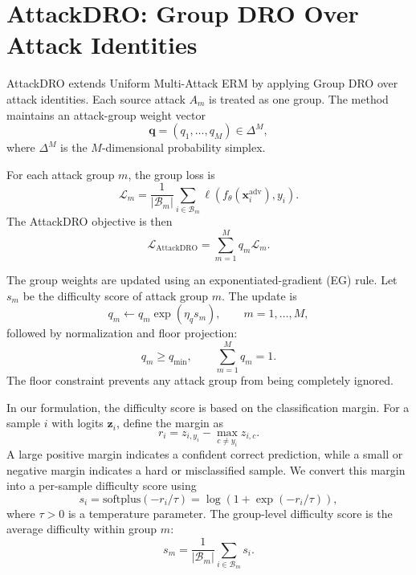 \section{AttackDRO: Group DRO Over Attack Identities}
\label{sec:ch4_attackdro}

AttackDRO extends Uniform Multi-Attack ERM by applying Group DRO over attack
identities. Each source attack \(A_m\) is treated as one group. The method
maintains an attack-group weight vector
\begin{equation}
    \mathbf{q} = (q_1,\ldots,q_M) \in \Delta^M,
\end{equation}
where \(\Delta^M\) is the \(M\)-dimensional probability simplex.

For each attack group \(m\), the group loss is
\begin{equation}
    \mathcal{L}_m
    =
    \frac{1}{|\mathcal{B}_m|}
    \sum_{i \in \mathcal{B}_m}
    \ell\!\left(
        f_\theta(\mathbf{x}_i^{\mathrm{adv}}),
        y_i
    \right).
\end{equation}
The AttackDRO objective is then
\begin{equation}
    \mathcal{L}_{\mathrm{AttackDRO}}
    =
    \sum_{m=1}^{M} q_m \mathcal{L}_m.
\end{equation}

The group weights are updated using an exponentiated-gradient (EG) rule. Let \(s_m\)
be the difficulty score of attack group \(m\). The update is
\begin{equation}
    q_m \leftarrow q_m \exp(\eta_q s_m),
    \qquad m=1,\ldots,M,
    \label{eq:eg}
\end{equation}
followed by normalization and floor projection:
\begin{equation}
    q_m \ge q_{\min},
    \qquad
    \sum_{m=1}^{M} q_m = 1.
    \label{eq:attackdro_floor}
\end{equation}
The floor constraint prevents any attack group from being completely ignored.

In our formulation, the difficulty score is based on the classification margin. For a
sample \(i\) with logits \(\mathbf{z}_i\), define the margin as
\begin{equation}
    r_i
    =
    z_{i,y_i}
    -
    \max_{c \ne y_i} z_{i,c}.
\end{equation}
A large positive margin indicates a confident correct prediction, while a small or
negative margin indicates a hard or misclassified sample. We convert this margin into
a per-sample difficulty score using
\begin{equation}
    s_i
    =
    \mathrm{softplus}(-r_i/\tau)
    =
    \log(1+\exp(-r_i/\tau)),
\end{equation}
where \(\tau>0\) is a temperature parameter. The group-level difficulty score is the
average difficulty within group \(m\):
\begin{equation}
    s_m
    =
    \frac{1}{|\mathcal{B}_m|}
    \sum_{i\in\mathcal{B}_m} s_i.
\end{equation}

